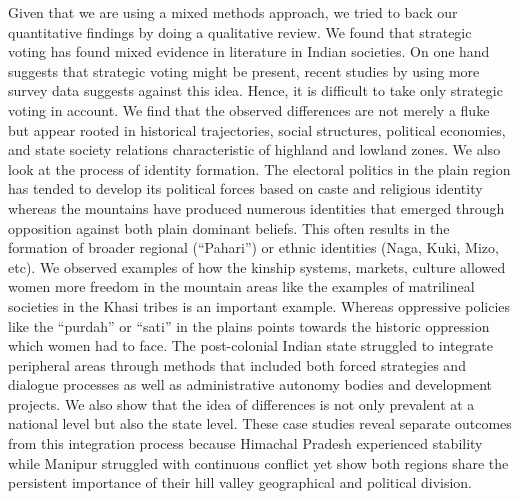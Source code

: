 \begin{sloppypar}
Given that we are using a mixed methods approach, we tried to back our quantitative findings by doing a qualitative review. We found that strategic voting has found mixed evidence in literature in Indian societies. On one hand \cite{choi2009strategic} suggests that strategic voting might be present, recent studies by \cite{ziegfeld2021accounts} using more survey data  suggests against this idea. Hence, it is difficult to take only strategic voting in account. We find that the observed differences are not merely a fluke but appear rooted in  historical trajectories, social structures, political economies, and state society relations characteristic of highland and lowland zones.  We also look at the process of identity formation. The electoral politics in the plain region has tended to develop its political forces based on caste and religious identity whereas the mountains have produced numerous identities that emerged through opposition against both plain dominant beliefs. This often results in the formation of broader regional (``Pahari'') or ethnic identities (Naga, Kuki, Mizo, etc). We observed examples of how the kinship systems, markets, culture allowed women more freedom in the mountain areas like the examples of matrilineal societies in the Khasi tribes is an important example. Whereas oppressive policies like the ``purdah'' or ``sati'' in the plains points towards the historic oppression which women had to face.  The post-colonial Indian state struggled to integrate peripheral areas through methods that included both forced strategies and dialogue processes as well as administrative autonomy bodies and development projects. We also show that the idea of differences is not only prevalent at a national level but also the state level. These case studies reveal separate outcomes from this integration process because Himachal Pradesh experienced stability while Manipur struggled with continuous conflict yet show both regions share the persistent importance of their hill valley geographical and political division.


\end{sloppypar}
